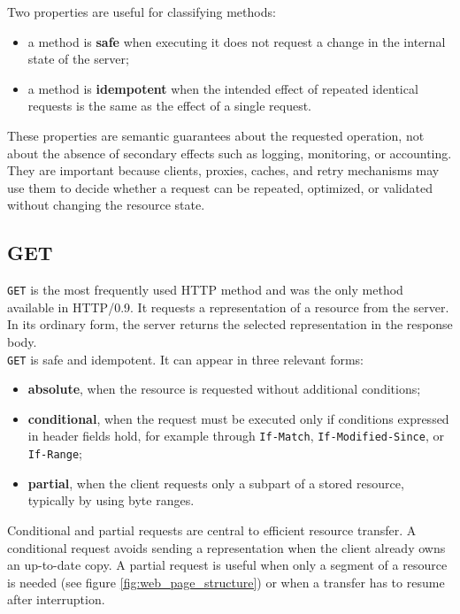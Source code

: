 \documentclass{scrbook}
\begin{document}
Two properties are useful for classifying methods:
\begin{itemize}
    \item a method is \textbf{safe} when executing it does not request a change in the internal state of the server;
    \item a method is \textbf{idempotent} when the intended effect of repeated identical requests is the same as the effect of a single request.
\end{itemize}

These properties are semantic guarantees about the requested operation, not about the absence of secondary effects such as logging, monitoring, or accounting. They are important because clients, proxies, caches, and retry mechanisms may use them to decide whether a request can be repeated, optimized, or validated without changing the resource state.

\subsection{GET}

\texttt{GET} is the most frequently used HTTP method and was the only method available in HTTP/0.9. It requests a representation of a resource from the server. In its ordinary form, the server returns the selected representation in the response body.\\

\texttt{GET} is safe and idempotent. It can appear in three relevant forms:
\begin{itemize}
    \item \textbf{absolute}, when the resource is requested without additional conditions;
    \item \textbf{conditional}, when the request must be executed only if conditions expressed in header fields hold, for example through \texttt{If-Match}, \texttt{If-Modified-Since}, or \texttt{If-Range};
    \item \textbf{partial}, when the client requests only a subpart of a stored resource, typically by using byte ranges.
\end{itemize}

Conditional and partial requests are central to efficient resource transfer. A conditional request avoids sending a representation when the client already owns an up-to-date copy. A partial request is useful when only a segment of a resource is needed (see figure \ref{fig:web_page_structure}) or when a transfer has to resume after interruption.
\end{document}
